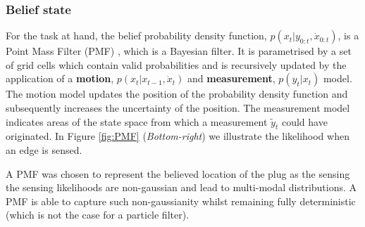 \subsubsection{Belief state}
For the task at hand, the belief probability density function,  $p(x_t|y_{0:t},\dot{x}_{0:t})$,  
is a Point Mass Filter (PMF) \cite[p.87]{Bergman99recursivebayesian}, which is a  Bayesian filter.
It is parametrised by a set of grid cells  which contain valid probabilities 
and is recursively updated by the application of a \textbf{motion}, $p(x_t|x_{t-1},\dot{x}_t)$ 
and \textbf{measurement}, $p(y_t|x_t)$ model. The motion model updates the position of the probability density function 
and subsequently increases the uncertainty of the position.  The measurement model indicates areas 
of the state space from which a measurement $\tilde{y}_t$ could have originated. 
In Figure \ref{fig:PMF} (\textit{Bottom-right}) we illustrate the likelihood when an edge is sensed.

A PMF was chosen to represent the believed location of the plug as the sensing 
the sensing likelihoods are non-gaussian and lead to multi-modal distributions.  
A PMF is able to capture such non-gaussianity whilst remaining fully deterministic 
(which is not the case for a particle filter).

